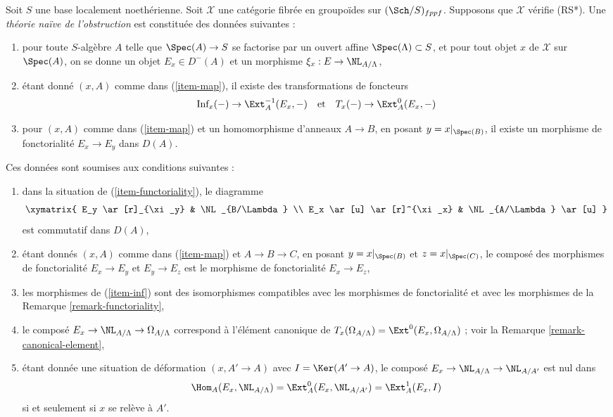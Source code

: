 \begin{definition}
\label{definition-naive-obstruction-theory}
Soit $S$ une base localement noethérienne. Soit $\mathcal{X}$ une catégorie fibrée
en groupoïdes sur $(\Sch/S)_{fppf}$. Supposons que $\mathcal{X}$
vérifie (RS*). Une {\it théorie naïve de l'obstruction} est
constituée des données suivantes :
\begin{enumerate}
\item
\label{item-map}
pour toute $S$-algèbre $A$ telle que $\Spec(A) \to S$
se factorise par un ouvert affine $\Spec(\Lambda) \subset S$, et pour tout objet $x$
de $\mathcal{X}$ sur $\Spec(A)$, on se donne un objet $E_x \in D^-(A)$
et un morphisme $\xi_x : E \to \NL_{A/\Lambda}$,
\item
\label{item-inf}
étant donné $(x, A)$ comme dans (\ref{item-map}), il existe des transformations de
foncteurs
$$
\text{Inf}_x( - ) \to \Ext^{-1}_A(E_x, -)
\quad\text{et}\quad
T_x(-) \to \Ext^0_A(E_x, -)
$$
\item
\label{item-functoriality}
pour $(x, A)$ comme dans (\ref{item-map}) et un homomorphisme d'anneaux $A \to B$,
en posant $y = x|_{\Spec(B)}$, il existe un morphisme de fonctorialité
$E_x \to E_y$ dans $D(A)$.
\end{enumerate}
Ces données sont soumises aux conditions suivantes :
\begin{enumerate}
\item[(i)]
dans la situation de (\ref{item-functoriality}), le diagramme
$$
\xymatrix{
E_y \ar[r]_{\xi_y} & \NL_{B/\Lambda} \\
E_x \ar[u] \ar[r]^{\xi_x} & \NL_{A/\Lambda} \ar[u]
}
$$
est commutatif dans $D(A)$,
\item[(ii)]
étant donnés $(x, A)$ comme dans (\ref{item-map}) et $A \to B \to C$,
en posant $y = x|_{\Spec(B)}$ et $z = x|_{\Spec(C)}$, le
composé des morphismes de fonctorialité $E_x \to E_y$ et $E_y \to E_z$ est
le morphisme de fonctorialité $E_x \to E_z$,
\item[(iii)]
les morphismes de (\ref{item-inf}) sont des isomorphismes
compatibles avec les morphismes de fonctorialité
et avec les morphismes de la Remarque \ref{remark-functoriality},
\item[(iv)]
le composé $E_x \to \NL_{A/\Lambda} \to \Omega_{A/\Lambda}$
correspond à l'élément canonique de
$T_x(\Omega_{A/\Lambda}) = \Ext^0(E_x, \Omega_{A/\Lambda})$ ; voir la
Remarque \ref{remark-canonical-element},
\item[(v)]
étant donnée une situation de déformation $(x, A' \to A)$ avec $I = \Ker(A' \to A)$,
le composé $E_x \to \NL_{A/\Lambda} \to \NL_{A/A'}$ est nul dans
$$
\Hom_A(E_x, \NL_{A/\Lambda}) = \Ext^0_A(E_x, \NL_{A/A'}) =
\Ext^1_A(E_x, I)
$$
si et seulement si $x$ se relève à $A'$.
\end{enumerate}
\end{definition}

